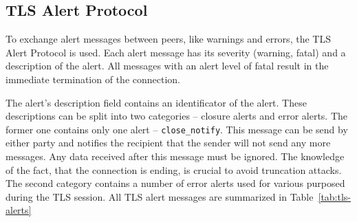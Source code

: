 \subsection{TLS Alert Protocol}
    To exchange alert messages between peers, like warnings and errors, the
    TLS Alert Protocol is used. Each alert message has its severity (warning,
    fatal) and a description of the alert. All messages with an alert level
    of fatal result in the immediate termination of the connection.

    The alert's description field contains an identificator of the alert.
    These descriptions can be split into two categories -- closure alerts
    and error alerts. The former one contains only one alert --
    \texttt{close\_notify}. This message can be send by either party and
    notifies the recipient that the
    sender will not send any more messages. Any data received after this message
    must be ignored. The knowledge of the fact, that the connection is ending,
    is crucial to avoid truncation attacks.
    The second category contains a number of error alerts used for various
    purposed during the TLS session. All TLS alert messages are summarized
    in Table~\ref{tab:tls-alerts}
    \\

